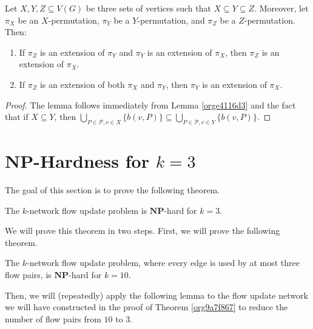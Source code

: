 \documentclass[fontsize=11pt,paper=a4]{book}
\begin{document}
\begin{lem}
Let \(X,Y,Z\subseteq V(G)\) be three sets of vertices such that \(X\subseteq Y\subseteq Z\).
Moreover, let \(\pi_X\) be an \(X\)-permutation, \(\pi_Y\) be a \(Y\)-permutation, and \(\pi_Z\) be a \(Z\)-permutation.
Then:

\begin{enumerate}
\item \label{itm:lem-three-permutations-2-1}
If \(\pi_Z\) is an extension of \(\pi_Y\) and \(\pi_Y\) is an extension of \(\pi_X\), then \(\pi_Z\) is an extension of \(\pi_X\).

\item \label{itm:lem-three-permutations-2-2}
If \(\pi_Z\) is an extension of both \(\pi_X\) and \(\pi_Y\), then \(\pi_Y\) is an extension of \(\pi_X\).
\end{enumerate}
\label{orgff8a5ac}
\end{lem}

\begin{proof}
The lemma follows immediately from Lemma \ref{orge4116d3} and the fact that if \(X\subseteq Y\), then \(\bigcup_{P\in\mathcal{P},v\in X}\{b(v,P)\}\subseteq\bigcup_{P\in\mathcal{P},v\in Y}\{b(v,P)\}\).
\end{proof}

\part{\(\textbf{NP}\)-Hardness for \(k=3\)}
\label{sec:org932ea3c}

The goal of this section is to prove the following theorem.

\begin{thm}
The \(k\)-network flow update problem is \(\textbf{NP}\)-hard for \(k=3\).
\label{org4deb635}
\end{thm}

We will prove this theorem in two steps.
First, we will prove the following theorem.

\begin{thm}
The \(k\)-network flow update problem, where every edge is used by at most three flow pairs, is \(\textbf{NP}\)-hard for \(k=10\).
\label{org9a7f867}
\end{thm}

Then, we will (repeatedly) apply the following lemma to the flow update network we will have constructed in the proof of Theorem \ref{org9a7f867} to reduce the number of flow pairs from \(10\) to \(3\).
\end{document}
